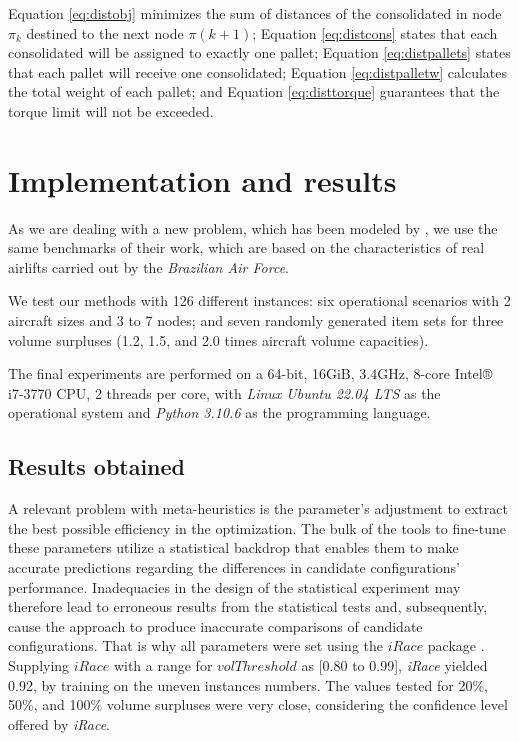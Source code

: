 \documentclass[preprint,authoryear]{elsarticle}
\begin{document}
Equation \ref{eq:distobj} minimizes the sum of distances of the consolidated in node $\pi_k$ destined to the next node $\pi(k+1)$; Equation \ref{eq:distcons} states that each consolidated will be assigned to exactly one pallet; Equation \ref{eq:distpallets} states that each pallet will receive one consolidated; Equation \ref{eq:distpalletw} calculates the total weight of each pallet; and Equation \ref{eq:disttorque} guarantees that the torque limit will not be exceeded. 


\section{Implementation and results}
\label{sec6}


As we are dealing with a new problem, which has been modeled by \cite{MesquitaSanches2023}, we use the same benchmarks of their work, which are based on the characteristics of real airlifts carried out by the {\em Brazilian Air Force}.
 
We test our methods with 126 different instances: six operational scenarios with 2 aircraft sizes and 3 to 7 nodes; and seven randomly generated item sets for three volume surpluses (1.2, 1.5, and 2.0 times aircraft volume capacities).

The final experiments are performed on a 64-bit, 16GiB, 3.4GHz, 8-core Intel® i7-3770 CPU, 2 threads per core, with {\it Linux Ubuntu 22.04 LTS} as the operational system and {\it Python 3.10.6} as the programming language.

\subsection{Results obtained}


A relevant problem with meta-heuristics is the parameter's adjustment to extract the best possible efficiency in the optimization. The bulk of the tools to fine-tune these parameters utilize a statistical backdrop that enables them to make accurate predictions regarding the differences in candidate configurations' performance. Inadequacies in the design of the statistical experiment may therefore lead to erroneous results from the statistical tests and, subsequently, cause the approach to produce inaccurate comparisons of candidate configurations. That is why all parameters were set using the $iRace$ package \cite{LopezIbanezManuel2016}. Supplying $iRace$ with a range for $volThreshold$ as [0.80 to 0.99], {\it iRace} yielded 0.92, by training on the uneven instances numbers. The values tested for 20\%, 50\%, and 100\% volume surpluses were very close, considering the confidence level offered by {\it iRace}.
\end{document}
